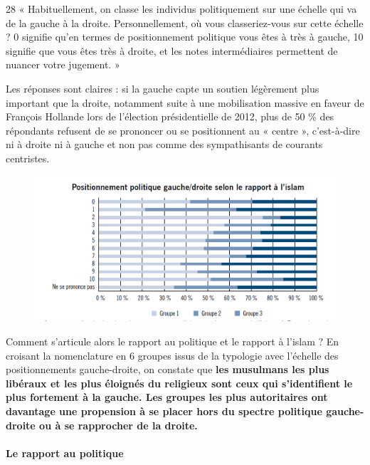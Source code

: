 28 « Habituellement, on classe les individus politiquement sur une
échelle qui va de la gauche à la droite. Personnellement, où vous
classeriez-vous sur cette échelle ? 0 signifie qu'en termes de
positionnement politique vous êtes à très à gauche, 10 signifie que vous
êtes très à droite, et les notes intermédiaires permettent de nuancer
votre jugement. »

Les réponses sont claires : si la gauche capte un soutien légèrement
plus important que la droite, notamment suite à une mobilisation massive
en faveur de François Hollande lors de l'élection présidentielle de
2012, plus de 50 \% des répondants refusent de se prononcer ou se
positionnent au « centre », c'est-à-dire ni à droite ni à gauche et non
pas comme des sympathisants de courants centristes.

\begin{figure}
    \centering
    
\includegraphics[width=\textwidth]{ImageIslamFrance/GaucheDroitepargroupe.png}
 
\end{figure}



Comment s'articule alors le rapport au politique et le rapport à l'islam
? En croisant la nomenclature en 6 groupes issus de la typologie avec
l'échelle des positionnements gauche-droite, on constate que \textbf{les
musulmans les plus libéraux et les plus éloignés du religieux sont ceux
qui s'identifient le plus fortement à la gauche. Les groupes les plus
autoritaires ont davantage une propension à se placer hors du spectre
politique gauche-droite ou à se rapprocher de la droite.}


\paragraph{Le rapport au politique}


